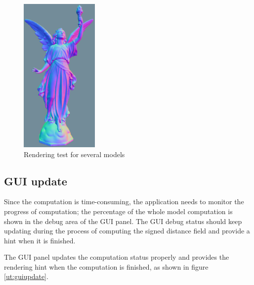 \begin{figure}[htbp]
{\begin{minipage}[t]{0.5\linewidth}
        \includegraphics[width=1.5in]{Images/Chap5/lucy_c.png}
    \end{minipage}
    }%
    \centering
    \caption{Rendering test for several models}
    \label{ut:model}
\end{figure}

\subsection{GUI update}

Since the computation is time-consuming, the application needs to monitor the progress of computation; the percentage of the whole model computation is shown in the debug area of the GUI panel. The GUI debug status should keep updating during the process of computing the signed distance field and provide a hint when it is finished. 

\clearpage

The GUI panel updates the computation status properly and provides the rendering hint when the computation is finished, as shown in figure \ref{ut:guiupdate}.


